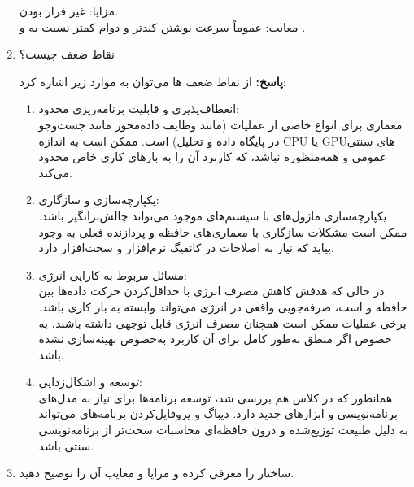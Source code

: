 \documentclass[12pt]{exam}
\begin{document}
\begin{questions}
\begin{enumerate}
مزایا: غیر فرار بودن. \\
معایب: عموماً سرعت نوشتن کندتر و دوام کمتر نسبت به  و .
	
	
	
	
	
	\item 
	نقاط ضعف  چیست؟
	
	\textbf{پاسخ:} از نقاط ضعف  ها می‌توان به موارد زیر اشاره کرد:
	
	
	\begin{enumerate}
		\item انعطاف‌پذیری و قابلیت برنامه‌ریزی محدود:\\
معماری  برای انواع خاصی از عملیات (مانند وظایف داده‌محور مانند جست‌وجو در پایگاه داده و تحلیل) است. ممکن است به اندازه CPU یا GPUهای سنتی عمومی و همه‌منظوره نباشد، که کاربرد آن را به بارهای کاری خاص محدود می‌کند.
		
		
		
		\item یکپارچه‌سازی و سازگاری:\\
یکپارچه‌سازی ماژول‌های  با سیستم‌های موجود می‌تواند چالش‌برانگیز باشد. ممکن است مشکلات سازگاری با معماری‌های حافظه و پردازنده فعلی به وجود بیاید که نیاز به اصلاحات در کانفیگ نرم‌افزار و سخت‌افزار دارد.
		
		
		
		\item مسائل مربوط به کارایی انرژی:\\
در حالی که  هدفش کاهش مصرف انرژی با حداقل‌کردن حرکت داده‌ها بین حافظه و  است،‌ صرفه‌جویی واقعی در انرژی می‌تواند وابسته به بار کاری باشد. برخی عملیات ممکن است همچنان مصرف انرژی قابل توجهی داشته باشند، به خصوص اگر منطق  به‌طور کامل برای آن کاربرد به‌خصوص بهینه‌سازی نشده باشد.
		
		
		
		\item توسعه و اشکال‌زدایی:\\
همانطور که در کلاس هم بررسی شد، توسعه برنامه‌ها برای  نیاز به مدل‌های برنامه‌نویسی و ابزارهای جدید دارد. دیباگ و پروفایل‌کردن برنامه‌های  می‌تواند به دلیل طبیعت توزیع‌شده و درون حافظه‌ای محاسبات سخت‌تر از برنامه‌نویسی  سنتی باشد.
		
	\end{enumerate}
	
	
	\item 
	ساختار  را معرفی کرده و مزایا و معایب آن را توضیح دهید.
	

\end{enumerate}
\end{questions}
\end{document}
